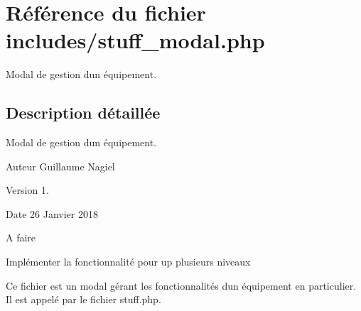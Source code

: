 \hypertarget{stuff__modal_8php}{}\section{Référence du fichier includes/stuff\+\_\+modal.php}
\label{stuff__modal_8php}


Modal de gestion d\textquotesingle{}un équipement.  




\subsection{Description détaillée}
Modal de gestion d\textquotesingle{}un équipement. 

\begin{DoxyAuthor}{Auteur}
Guillaume Nagiel 
\end{DoxyAuthor}
\begin{DoxyVersion}{Version}
1. 
\end{DoxyVersion}
\begin{DoxyDate}{Date}
26 Janvier 2018 
\end{DoxyDate}
\begin{DoxyRefDesc}{A faire}
\item[\mbox{\hyperlink{todo__todo000002}{A faire}}]Implémenter la fonctionnalité pour up plusieurs niveaux \end{DoxyRefDesc}


Ce fichier est un modal gérant les fonctionnalités d\textquotesingle{}un équipement en particulier. Il est appelé par le fichier stuff.\+php. 